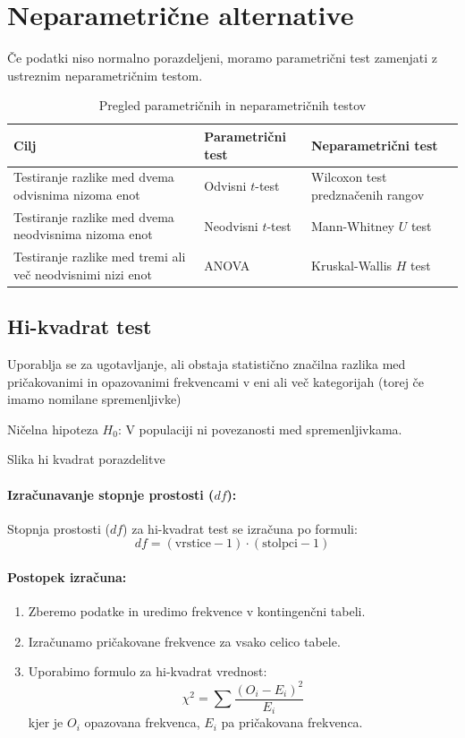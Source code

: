 \section{Neparametrične alternative}

Če podatki niso normalno porazdeljeni, moramo parametrični test zamenjati z ustreznim neparametričnim testom.

\begin{table}[h!]
    \centering
    \begin{tabular}{|l|l|l|}
    \hline
    \textbf{Cilj} & \textbf{Parametrični test} & \textbf{Neparametrični test} \\ \hline
    Testiranje razlike med dvema odvisnima nizoma enot & Odvisni $t$-test & Wilcoxon test predznačenih rangov \\ \hline
    Testiranje razlike med dvema neodvisnima nizoma enot & Neodvisni $t$-test & Mann-Whitney $U$ test \\ \hline
    Testiranje razlike med tremi ali več neodvisnimi nizi enot & ANOVA & Kruskal-Wallis $H$ test \\ \hline
    \end{tabular}
    \caption{Pregled parametričnih in neparametričnih testov}
\end{table}

\subsection{Hi-kvadrat test}

Uporablja se za ugotavljanje, ali obstaja statistično značilna razlika med pričakovanimi in opazovanimi frekvencami v eni ali več kategorijah (torej če imamo nomilane spremenljivke)

Ničelna hipoteza $H_0$: V populaciji ni povezanosti med spremenljivkama.

Slika hi kvadrat porazdelitve

\paragraph{Izračunavanje stopnje prostosti ($df$):}
Stopnja prostosti ($df$) za hi-kvadrat test se izračuna po formuli:
\[df = (\text{vrstice} - 1) \cdot (\text{stolpci} - 1)\]

\paragraph{Postopek izračuna:}
\begin{enumerate}
    \item Zberemo podatke in uredimo frekvence v kontingenčni tabeli.
    \item Izračunamo pričakovane frekvence za vsako celico tabele.
    \item Uporabimo formulo za hi-kvadrat vrednost:
    \[\chi^2 = \sum \frac{(O_i - E_i)^2}{E_i}\]
    kjer je $O_i$ opazovana frekvenca, $E_i$ pa pričakovana frekvenca.
\end{enumerate}

